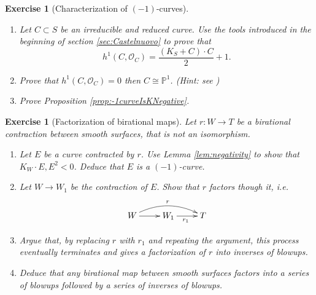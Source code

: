 \documentclass[a4paper,11pt]{amsart}
\newtheorem{exercise}[theorem]{Exercise}
\newcommand{\OO}{\mathcal{O}}
\newcommand{\PP}{\mathbb{P}}
\newcommand{\isom}{\cong}
\begin{document}
\begin{exercise}[{Characterization of $(-1)$-curves}]\label{exer:-1curveIsKNegative}\leavevmode
	\begin{enumerate}
		\item\label{it:arithmeticGenusFormula}	Let $C\subset S$ be an irreducible and reduced curve.
		Use the tools introduced in the beginning of section \ref{sec:Castelnuovo} to prove that
		\[
		h^1(C,\OO_C)  = \frac{(K_S + C)\cdot C}{2} +1.
		\]
		\item Prove that $h^1(C,\OO_C) = 0$ then $C \isom \PP^1$.
		{\small (Hint: see \cite[Exercise 1-1-5]{Matsuki})}
		\item Prove Proposition \ref{prop:-1curveIsKNegative}.
	\end{enumerate}
\end{exercise}

\begin{exercise}[Factorization of birational maps]\label{exer:factorization}
	Let $r\colon W \to T$ be a birational contraction between smooth surfaces, that is not an isomorphism.
	\begin{enumerate}
		\item Let $E$ be a curve contracted by $r$.
		Use Lemma \ref{lem:negativity} to show that $K_W \cdot E, E^2 < 0$.
		Deduce that $E$ is a $(-1)$-curve.
		\item Let $W \to W_1$ be the contraction of $E$.
		Show that $r$ factors though it, i.e.\
		\[
		\xymatrix{
		W \ar[r] \ar@/^1pc/[rr]^r & W_1 \ar[r]_{r_1} & T
		}
		\]
		\item Argue that, by replacing $r$ with $r_1$ and repeating the argument, this process eventually terminates and gives a factorization of $r$ into inverses of blowups.
		\item Deduce that any birational map between smooth surfaces factors into a series of blowups followed by a series of inverses of blowups.
	\end{enumerate}
\end{exercise}
\end{document}
